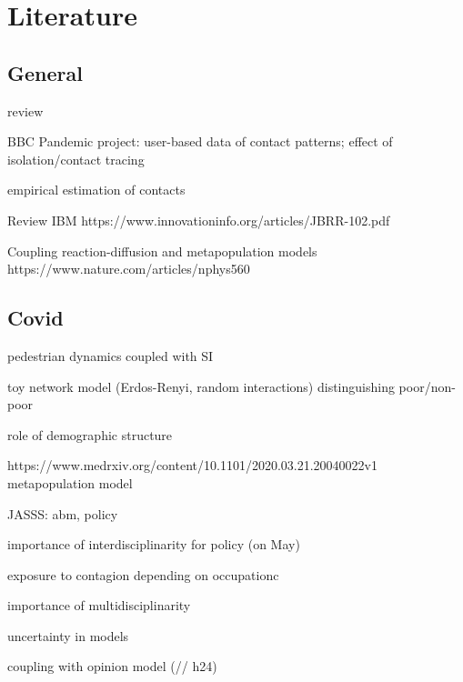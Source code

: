 \documentclass[10pt]{article}
\begin{document}
	



\section{Literature}

\subsection{General}


\cite{Heesterbeekaaa4339} review

\cite{Klepac2020.02.16.20023754} \cite{gog2020you} BBC Pandemic project: user-based data of contact patterns; \cite{Kucharski2020.04.23.20077024} effect of isolation/contact tracing

\cite{mossong2008social} empirical estimation of contacts

Review IBM https://www.innovationinfo.org/articles/JBRR-102.pdf

Coupling reaction-diffusion and metapopulation models https://www.nature.com/articles/nphys560

\subsection{Covid}

\cite{2020arXiv200409554R} pedestrian dynamics coupled with SI

\cite{2020arXiv200408653S} toy network model (Erdos-Renyi, random interactions) distinguishing poor/non-poor

\cite{Dowd9696} role of demographic structure

https://www.medrxiv.org/content/10.1101/2020.03.21.20040022v1 metapopulation model

\cite{squazzoni2020} JASSS: abm, policy

\cite{adam2020special}

\cite{haldane2020coronavirus} importance of interdisciplinarity for policy (on May)

\cite{ledandowski2020occupational} exposure to contagion depending on occupationc

\cite{doi:10.1111/tgis.12660}

\cite{BONTEMPI2020109814} importance of multidisciplinarity

\cite{juul2020fixedtime} uncertainty in models

\cite{alej2020incorporating} coupling with opinion model (// h24)
\end{document}

